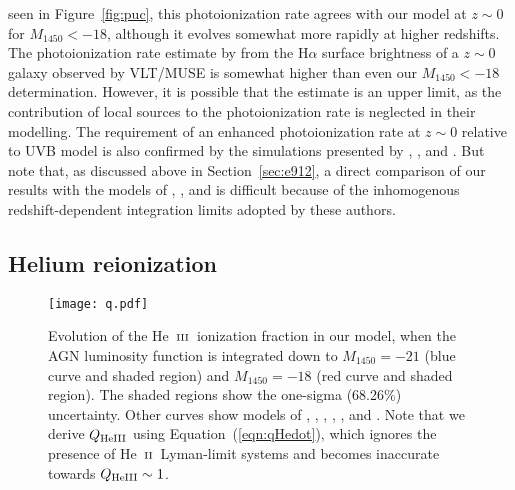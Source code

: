 \documentclass[fleqn,usenatbib]{mnras}
\def\nHeIII{{\rm HeIII}}
\def\HeII{\hbox{He~$\scriptstyle\rm II$}}
\def\HeIII{\hbox{He~$\scriptstyle\rm III$}}
\def\HeIII{\hbox{He~$\scriptstyle\rm III$}}
\begin{document}
seen in Figure~\ref{fig:puc}, this photoionization rate agrees with
our model at $z\sim 0$ for $M_{1450}<-18$, although it evolves
somewhat more rapidly at higher redshifts.  The photoionization rate
estimate by \citet{2017MNRAS.467.4802F} from the H$\alpha$ surface
brightness of a $z\sim 0$ galaxy observed by VLT/MUSE is somewhat
higher than even our $M_{1450}<-18$ determination.  However, it is
possible that the \citet{2017MNRAS.467.4802F} estimate is an upper
limit, as the contribution of local sources to the photoionization
rate is neglected in their modelling.  The requirement of an enhanced
photoionization rate at $z\sim 0$ relative to
\citet{2012ApJ...746..125H} UVB model is also confirmed by the
simulations presented by \citet{2017MNRAS.467L..86V},
\citet{2017ApJ...837..106O}, and \citet{2018arXiv180104931P}.  But
note that, as discussed above in Section~\ref{sec:e912}, a direct
comparison of our results with the models of
\citet{2015ApJ...813L...8M}, \citet{2015MNRAS.451L..30K}, and
\citet{2018arXiv180104931P} is difficult because of the inhomogenous
redshift-dependent integration limits adopted by these authors.

\subsection{Helium reionization}

\begin{figure}
  \begin{center}
    \texttt{[image: q.pdf]}
  \end{center}
  \caption{Evolution of the \HeIII\ ionization fraction in our model,
    when the AGN luminosity function is integrated down to
    $M_{1450}=-21$ (blue curve and shaded region) and $M_{1450}=-18$
    (red curve and shaded region).  The shaded regions show the
    one-sigma (68.26\%) uncertainty.  Other curves show models of
    \citet[solid grey]{2012ApJ...746..125H}, \citet[dashed
      grey]{2015ApJ...813L...8M}, \citet[brown with shaded
      region]{2016ApJ...828...90L}, \citet[blue]{2018arXiv180104931P},
    \citet[maroon]{2009ApJ...694..842M}, and
    \citet[green]{2014MNRAS.445.4186C}.  Note that we derive
    $Q_\nHeIII$ using Equation~(\ref{eqn:qHedot}), which ignores the
    presence of \HeII\ Lyman-limit systems and becomes inaccurate
    towards $Q_\nHeIII\sim 1$. \label{fig:qhe}}
\end{figure}
\end{document}
